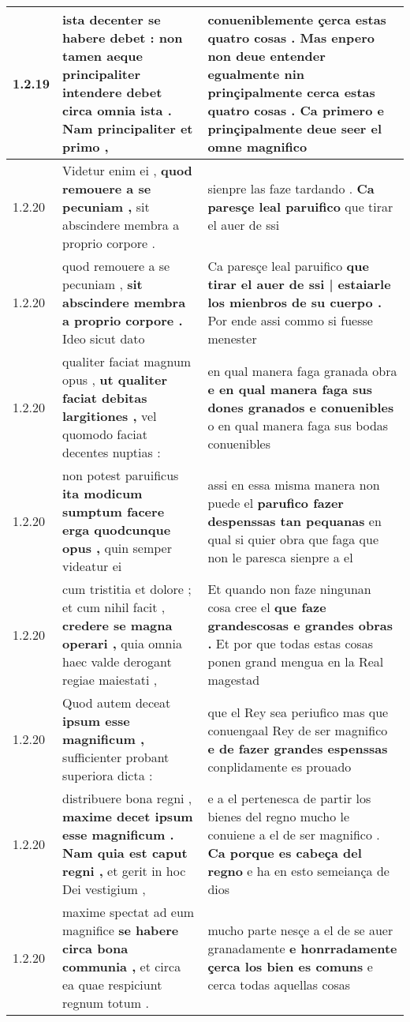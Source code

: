 \begin{tabular}{|p{1cm}|p{6.5cm}|p{6.5cm}|}
1.2.19 & ista decenter se habere debet : \textbf{ non tamen aeque principaliter intendere debet circa omnia ista . } Nam principaliter et primo , & conueniblemente çerca estas quatro cosas . \textbf{ Mas enpero non deue entender egualmente nin prinçipalmente cerca estas quatro cosas . } Ca primero e prinçipalmente deue seer el omne magnifico \\\hline
1.2.20 & Videtur enim ei , \textbf{ quod remouere a se pecuniam , } sit abscindere membra a proprio corpore . & sienpre las faze tardando . \textbf{ Ca paresçe leal paruifico } que tirar el auer de ssi \\\hline
1.2.20 & quod remouere a se pecuniam , \textbf{ sit abscindere membra a proprio corpore . } Ideo sicut dato & Ca paresçe leal paruifico \textbf{ que tirar el auer de ssi | estaiarle los mienbros de su cuerpo . } Por ende assi commo si fuesse menester \\\hline
1.2.20 & qualiter faciat magnum opus , \textbf{ ut qualiter faciat debitas largitiones , } vel quomodo faciat decentes nuptias : & en qual manera faga granada obra \textbf{ e en qual manera faga sus dones granados e conuenibles } o en qual manera faga sus bodas conuenibles \\\hline
1.2.20 & non potest paruificus \textbf{ ita modicum sumptum facere erga quodcunque opus , } quin semper videatur ei & assi en essa misma manera non puede el \textbf{ parufico fazer despenssas tan pequanas } en qual si quier obra que faga que non le paresca sienpre a el \\\hline
1.2.20 & cum tristitia et dolore ; et cum nihil facit , \textbf{ credere se magna operari , } quia omnia haec valde derogant regiae maiestati , & Et quando non faze ningunan cosa cree el \textbf{ que faze grandescosas e grandes obras . } Et por que todas estas cosas ponen grand mengua en la Real magestad \\\hline
1.2.20 & Quod autem deceat \textbf{ ipsum esse magnificum , } sufficienter probant superiora dicta : & que el Rey sea periufico mas que conuengaal Rey de ser magnifico \textbf{ e de fazer grandes espenssas } conplidamente es prouado \\\hline
1.2.20 & distribuere bona regni , \textbf{ maxime decet ipsum esse magnificum . Nam quia est caput regni , } et gerit in hoc Dei vestigium , & e a el pertenesca de partir los bienes del regno mucho le conuiene a el de ser magnifico . \textbf{ Ca porque es cabeça del regno } e ha en esto semeiança de dios \\\hline
1.2.20 & maxime spectat ad eum magnifice \textbf{ se habere circa bona communia , } et circa ea quae respiciunt regnum totum . & mucho parte nesçe a el de se auer granadamente \textbf{ e honrradamente çerca los bien es comuns } e cerca todas aquellas cosas \\\hline

\end{tabular}
